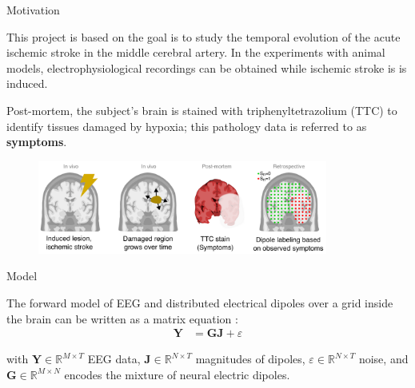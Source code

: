 \documentclass[final]{beamer}
\newlength{\colwidth}
\newcommand{\J}{\mathbf{J}}
\newcommand{\Y}{\mathbf{Y}}
\newcommand{\G}{\mathbf{G}}
\newcommand{\R}{\mathbb{R}}
\begin{document}
\begin{frame}[t]
\begin{columns}[t]
\begin{column}{\colwidth}
\begin{block}{Motivation}

This project is based on the
goal is to study the temporal evolution of the acute ischemic stroke in the middle cerebral artery. 
%
In the experiments with animal models, electrophysiological recordings can be obtained while ischemic stroke is is induced.

Post-mortem,
the subject's brain is stained with triphenyltetrazolium
(TTC) to identify tissues damaged by hypoxia; 
this pathology data is
referred to as \textbf{symptoms}.



\begin{figure}
\centering
\includegraphics[width=0.85\textwidth]{img/motivation}
\end{figure}

\end{block}

\begin{exampleblock}{Model}

The forward model of EEG and distributed electrical dipoles over a grid inside the brain can be written as a matrix equation \cite{hallez2007review}:
\begin{align}
    \Y &= \G \J + \varepsilon 
\end{align}
\item 
with $\Y \in \R^{M\times T}$ EEG data, 
$\J \in \R^{N\times T}$ magnitudes of dipoles, 
$\varepsilon \in \R^{N\times T}$ noise,
and 
$\G \in \R^{M\times N}$ encodes the mixture of neural electric dipoles. 


\end{exampleblock}
\end{column}
\end{columns}
\end{frame}
\end{document}
